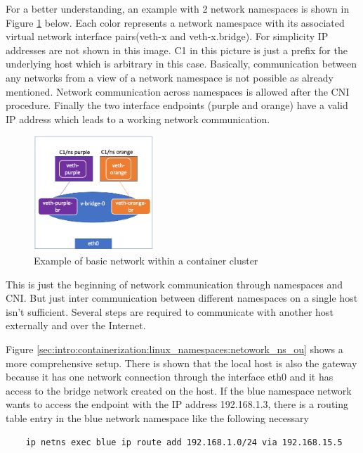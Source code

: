 For a better understanding, an example with 2 network namespaces is shown in Figure \ref{sec:intro:containerization:linux_namespaces:netowork_ns} below. Each color represents a network namespace with its associated virtual network interface pairs(veth-x and veth-x.bridge). For simplicity IP addresses are not shown in this image. C1 in this picture is just a prefix for the underlying host which is arbitrary in this case. Basically, communication between any networks from a view of a network namespace is not possible as already mentioned. Network communication across namespaces is allowed after the CNI procedure. Finally the two interface endpoints (purple and orange) have a valid IP address which leads to a working network communication.

\begin{figure}[htbp]
 \centering
 \includegraphics[width=0.4\textwidth]{gfx/examples/network_ns}
 \caption{Example of basic network within a container cluster}
\label{sec:intro:containerization:linux_namespaces:netowork_ns}
\end{figure}

This is just the beginning of network communication through namespaces and CNI. But just inter communication between different namespaces on a single host isn't sufficient. Several steps are required to communicate with another host externally and over the Internet.

Figure \ref{sec:intro:containerization:linux_namespaces:netowork_ns_ou} shows a more comprehensive setup. 
There is shown that the local host is also the gateway because it has one network connection through the interface eth0 and it has access to the bridge network created on the host. If the blue namespace network wants to access the endpoint with the IP address 192.168.1.3, there is a routing table entry in the blue network namespace like the following necessary 

\begin{lstlisting}
	ip netns exec blue ip route add 192.168.1.0/24 via 192.168.15.5
\end{lstlisting}

